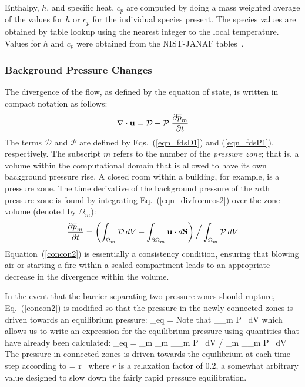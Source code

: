 \documentclass[11pt]{book}
\begin{document}
Enthalpy, $h$, and specific heat, $c_p$ are computed by doing a mass weighted average of the values for $h$ or $c_p$ for the individual species present.
The species values are obtained by table lookup using the nearest integer to the local temperature.  Values for $h$ and $c_p$ were obtained from the NIST-JANAF tables~\cite{NIST_JANAF}.

\subsubsection{Background Pressure Changes}

The divergence of the flow, as defined by the equation of state, is written in compact notation as follows:
\begin{equation}
\label{eqn_divfromeos2}
\nabla \cdot {\bf u} = {\cal D} - {\cal P}\; \frac{\partial \overline{p}_m}{\partial t}
\end{equation}
The terms $\mathcal{D}$ and $\mathcal{P}$ are defined by Eqs.~(\ref{eqn_fdsD1}) and (\ref{eqn_fdsP1}), respectively. The subscript $m$ refers to the
number of the {\em pressure zone}; that is, a volume within the computational domain that is allowed to have its own background pressure rise. A closed room
within a building, for example, is a pressure zone.
The time derivative of the background pressure of the $m$th
pressure zone is found by integrating Eq.~(\ref{eqn_divfromeos2}) over the zone volume (denoted by $\Omega_m$):
\begin{equation}
\frac{\partial \overline{p}_m}{\partial t} = \left( \int_{\Omega_m} {\cal D} \, dV - \int_{\partial \Omega_m} {\bf u} \cdot d{\bf S} \right) \Big/ \int_{\Omega_m} {\cal P} \, dV  \label{concon2}
\end{equation}
Equation~(\ref{concon2}) is essentially a consistency condition, ensuring that blowing air or starting a fire within a sealed
compartment leads to an appropriate decrease in the divergence within the volume.

In the event that the barrier separating two pressure zones should rupture, Eq.~(\ref{concon2}) is modified so that the pressure in the
newly connected zones is driven towards an equilibrium pressure:
\be
   \bp_{eq} = 
\ee
Note that
\be
  \int_{\Omega_m} {\cal P} \, dV \approx  {}
\ee
which allows us to write an expression for the equilibrium pressure using quantities that have already been calculated:
\be
  \bp_{eq} = \sum_m \bp_m \int_{\Omega_m} {\cal P} \, dV  \Big/  \sum_m \int_{\Omega_m} {\cal P} \, dV
\ee
The pressure in connected zones is driven towards the equilibrium at each time step according to
\be
    = r \, 
\ee
where $r$ is a relaxation factor of 0.2, a somewhat arbitrary value designed to slow down the fairly rapid pressure equilibration.
\end{document}

